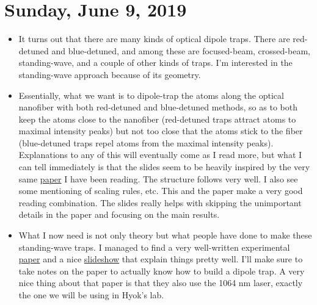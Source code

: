 \documentclass{report}
\theoremstyle{definition}
\begin{document}
\section{Sunday, June 9, 2019}



\begin{itemize}
	\item It turns out that there are many kinds of optical dipole traps. There are red-detuned and blue-detuned, and among these are focused-beam, crossed-beam, standing-wave, and a couple of other kinds of traps. I'm interested in the standing-wave approach because of its geometry. 
	
	\item Essentially, what we want is to dipole-trap the atoms along the optical nanofiber with both red-detuned and blue-detuned methods, so as to both keep the atoms close to the nanofiber (red-detuned traps attract atoms to maximal intensity peaks) but not too close that the atoms stick to the fiber (blue-detuned traps repel atoms from the maximal intensity peaks). Explanations to any of this will eventually come as I read more, but what I can tell immediately is that the slides seem to be heavily inspired by the very same \href{https://arxiv.org/pdf/physics/9902072.pdf}{paper} I have been reading. The structure follows very well. I also see some mentioning of scaling rules, etc. This and the paper make a very good reading combination. The slides really helps with skipping the unimportant details in the paper and focusing on the main results. 
	
	\item What I now need is not only theory but what people have done to make these standing-wave traps. I managed to find a very well-written experimental \href{http://quantum-technologies.iap.uni-bonn.de/de/component/publications/?task=download\&file=69\&token=de46701d9e5eb9e185abc9784c3f8313}{paper} and a nice \href{https://www.mpq.mpg.de/5020867/0515b_atom_traps.pdf}{slideshow} that explain things pretty well. I'll make sure to take notes on the paper to actually know how to build a dipole trap. A very nice thing about that paper is that they also use the 1064 nm laser, exactly the one we will be using in Hyok's lab.
	
	
	

\end{itemize}
\end{document}
